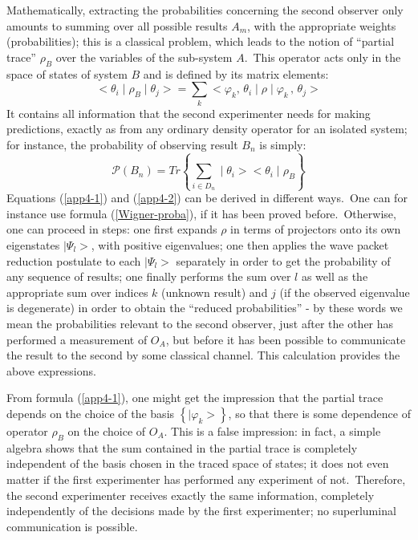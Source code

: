 \documentclass[12pt,onecolumn]{article}%
\begin{document}
Mathematically, extracting the probabilities concerning the second observer
only amounts to summing over all possible results $A_{m}$, with the
appropriate weights (probabilities); this is a classical problem, which leads
to the notion of ``partial trace'' $\rho_{B}$ over the variables of the
sub-system $A$.\ This operator acts only in the space of states of system $B$
and is defined by its matrix elements:%
\begin{equation}
<\theta_{i}\mid\rho_{B}\mid\theta_{j}>=\sum_{k}<\varphi_{k},\,\theta_{i}%
\mid\rho\mid\varphi_{k}\,,\,\theta_{j}> \label{app4-1}%
\end{equation}
It contains all information that the second experimenter needs for making
predictions, exactly as from any ordinary density operator for an isolated
system; for instance, the probability of observing result $B_{n}$ is simply:%
\begin{equation}
\mathcal{P}(B_{n})=Tr\left\{  \sum_{i\in D_{n}}\mid\theta_{i}><\theta_{i}%
\mid\rho_{B}\right\}  \label{app4-2}%
\end{equation}
Equations (\ref{app4-1}) and (\ref{app4-2}) can be derived in different
ways.\ One can for instance use formula (\ref{Wigner-proba}), if it has been
proved before.\ Otherwise, one can proceed in steps: one first expands $\rho$
in terms of projectors onto its own eigenstates $\mid\Psi_{l}>$, with positive
eigenvalues; one then applies the wave packet reduction postulate to each
$\mid\Psi_{l}>$ separately in order to get the probability of any sequence of
results; one finally performs the sum over $l$ as well as the appropriate sum
over indices $k$ (unknown result) and $j$ (if the observed eigenvalue is
degenerate) in order to obtain the ``reduced probabilities'' - by these words
we mean the probabilities relevant to the second observer, just after the
other has performed a measurement of $O_{A}$, but before it has been possible
to communicate the result to the second by some classical channel. This
calculation provides the above expressions.

From formula (\ref{app4-1}), one might get the impression that the partial
trace depends on the choice of the basis $\left\{  \mid\varphi_{k}>\right\}
$, so that there is some dependence of operator $\rho_{B}$ on the choice of
$O_{A}$. This is a false impression: in fact, a simple algebra shows that the
sum contained in the partial trace is completely independent of the basis
chosen in the traced space of states; it does not even matter if the first
experimenter has performed any experiment of not.\ Therefore, the second
experimenter receives exactly the same information, completely independently
of the decisions made by the first experimenter; no superluminal communication
is possible.
\end{document}
